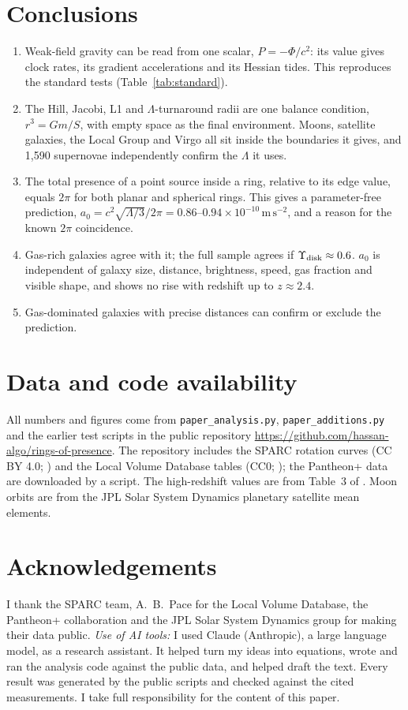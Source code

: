 \documentclass[11pt]{article}
\newcommand{\unit}[1]{\,\mathrm{#1}}
\newcommand{\aunit}{\times10^{-10}\unit{m\,s^{-2}}}
\begin{document}
\section{Conclusions}
\begin{enumerate}
\item Weak-field gravity can be read from one scalar, $P=-\Phi/c^2$: its value gives clock rates, its gradient accelerations and its Hessian tides. This reproduces the standard tests (Table~\ref{tab:standard}).
\item The Hill, Jacobi, L1 and $\Lambda$-turnaround radii are one balance condition, $r^3=Gm/S$, with empty space as the final environment. Moons, satellite galaxies, the Local Group and Virgo all sit inside the boundaries it gives, and 1,590 supernovae independently confirm the $\Lambda$ it uses.
\item The total presence of a point source inside a ring, relative to its edge value, equals $2\pi$ for both planar and spherical rings. This gives a parameter-free prediction, $a_0=c^2\sqrt{\Lambda/3}/2\pi=0.86$--$0.94\aunit$, and a reason for the known $2\pi$ coincidence.
\item Gas-rich galaxies agree with it; the full sample agrees if $\Upsilon_{\rm disk}\approx0.6$. $a_0$ is independent of galaxy size, distance, brightness, speed, gas fraction and visible shape, and shows no rise with redshift up to $z\approx2.4$.
\item Gas-dominated galaxies with precise distances can confirm or exclude the prediction.
\end{enumerate}

\section*{Data and code availability}
All numbers and figures come from \texttt{paper\_analysis.py}, \texttt{paper\_additions.py} and the earlier test scripts in the public repository \url{https://github.com/hassan-algo/rings-of-presence}. The repository includes the SPARC rotation curves (CC BY 4.0; \citealt{Lelli2016}) and the Local Volume Database tables (CC0; \citealt{Pace2024}); the Pantheon+ data are downloaded by a script. The high-redshift values are from Table~3 of \citet{Price2021}. Moon orbits are from the JPL Solar System Dynamics planetary satellite mean elements.

\section*{Acknowledgements}
I thank the SPARC team, A.~B.~Pace for the Local Volume Database, the Pantheon+ collaboration and the JPL Solar System Dynamics group for making their data public.
\emph{Use of AI tools:} I used Claude (Anthropic), a large language model, as a research assistant. It helped turn my ideas into equations, wrote and ran the analysis code against the public data, and helped draft the text. Every result was generated by the public scripts and checked against the cited measurements. I take full responsibility for the content of this paper.
\end{document}
